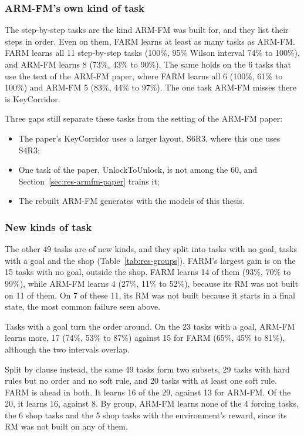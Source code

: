 \documentclass[11pt,english,listoffigures,listoftables]{tfgetsinf}
\begin{document}
\subsubsection{ARM-FM's own kind of task}
The step-by-step tasks are the kind ARM-FM was built for, and they list their steps in order. Even on them, FARM learns at least as many tasks as ARM-FM. FARM learns all 11 step-by-step tasks (100\%, 95\% Wilson interval 74\% to 100\%), and ARM-FM learns 8 (73\%, 43\% to 90\%). The same holds on the 6 tasks that use the text of the ARM-FM paper, where FARM learns all 6 (100\%, 61\% to 100\%) and ARM-FM 5 (83\%, 44\% to 97\%). The one task ARM-FM misses there is KeyCorridor.

Three gaps still separate these tasks from the setting of the ARM-FM paper:
\begin{itemize}
    \item The paper's KeyCorridor uses a larger layout, S6R3, where this one uses S4R3;
    \item One task of the paper, UnlockToUnlock, is not among the 60, and Section~\ref{sec:res-armfm-paper} trains it;
    \item The rebuilt ARM-FM generates with the models of this thesis.
\end{itemize}

\subsubsection{New kinds of task}
The other 49 tasks are of new kinds, and they split into tasks with no goal, tasks with a goal and the shop (Table~\ref{tab:res-groups}). FARM's largest gain is on the 15 tasks with no goal, outside the shop. FARM learns 14 of them (93\%, 70\% to 99\%), while ARM-FM learns 4 (27\%, 11\% to 52\%), because its RM was not built on 11 of them. On 7 of these 11, its RM was not built because it starts in a final state, the most common failure seen above.

Tasks with a goal turn the order around. On the 23 tasks with a goal, ARM-FM learns more, 17 (74\%, 53\% to 87\%) against 15 for FARM (65\%, 45\% to 81\%), although the two intervals overlap.

Split by clause instead, the same 49 tasks form two subsets, 29 tasks with hard rules but no order and no soft rule, and 20 tasks with at least one soft rule. FARM is ahead in both. It learns 16 of the 29, against 13 for ARM-FM. Of the 20, it learns 16, against 8. By group, ARM-FM learns none of the 4 forcing tasks, the 6 shop tasks and the 5 shop tasks with the environment's reward, since its RM was not built on any of them.
\end{document}
